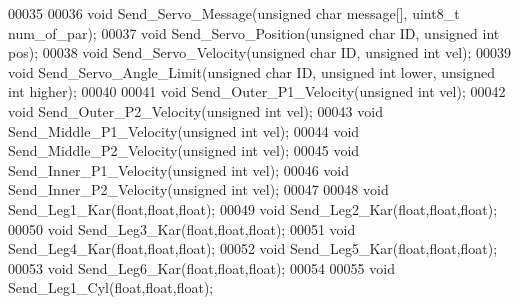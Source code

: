\begin{DoxyCode}
00035 
00036 \textcolor{keywordtype}{void} Send\_Servo\_Message(\textcolor{keywordtype}{unsigned} \textcolor{keywordtype}{char} message[], uint8\_t num\_of\_par);
00037 \textcolor{keywordtype}{void} Send\_Servo\_Position(\textcolor{keywordtype}{unsigned} \textcolor{keywordtype}{char} ID, \textcolor{keywordtype}{unsigned} \textcolor{keywordtype}{int} pos);
00038 \textcolor{keywordtype}{void} Send\_Servo\_Velocity(\textcolor{keywordtype}{unsigned} \textcolor{keywordtype}{char} ID, \textcolor{keywordtype}{unsigned} \textcolor{keywordtype}{int} vel);
00039 \textcolor{keywordtype}{void} Send\_Servo\_Angle\_Limit(\textcolor{keywordtype}{unsigned} \textcolor{keywordtype}{char} ID, \textcolor{keywordtype}{unsigned} \textcolor{keywordtype}{int} lower, \textcolor{keywordtype}{unsigned} \textcolor{keywordtype}{int} higher);
00040 
00041 \textcolor{keywordtype}{void} Send\_Outer\_P1\_Velocity(\textcolor{keywordtype}{unsigned} \textcolor{keywordtype}{int} vel); 
00042 \textcolor{keywordtype}{void} Send\_Outer\_P2\_Velocity(\textcolor{keywordtype}{unsigned} \textcolor{keywordtype}{int} vel); 
00043 \textcolor{keywordtype}{void} Send\_Middle\_P1\_Velocity(\textcolor{keywordtype}{unsigned} \textcolor{keywordtype}{int} vel); 
00044 \textcolor{keywordtype}{void} Send\_Middle\_P2\_Velocity(\textcolor{keywordtype}{unsigned} \textcolor{keywordtype}{int} vel); 
00045 \textcolor{keywordtype}{void} Send\_Inner\_P1\_Velocity(\textcolor{keywordtype}{unsigned} \textcolor{keywordtype}{int} vel); 
00046 \textcolor{keywordtype}{void} Send\_Inner\_P2\_Velocity(\textcolor{keywordtype}{unsigned} \textcolor{keywordtype}{int} vel); 
00047 
00048 \textcolor{keywordtype}{void} Send\_Leg1\_Kar(\textcolor{keywordtype}{float},\textcolor{keywordtype}{float},\textcolor{keywordtype}{float});
00049 \textcolor{keywordtype}{void} Send\_Leg2\_Kar(\textcolor{keywordtype}{float},\textcolor{keywordtype}{float},\textcolor{keywordtype}{float});
00050 \textcolor{keywordtype}{void} Send\_Leg3\_Kar(\textcolor{keywordtype}{float},\textcolor{keywordtype}{float},\textcolor{keywordtype}{float});
00051 \textcolor{keywordtype}{void} Send\_Leg4\_Kar(\textcolor{keywordtype}{float},\textcolor{keywordtype}{float},\textcolor{keywordtype}{float});
00052 \textcolor{keywordtype}{void} Send\_Leg5\_Kar(\textcolor{keywordtype}{float},\textcolor{keywordtype}{float},\textcolor{keywordtype}{float});
00053 \textcolor{keywordtype}{void} Send\_Leg6\_Kar(\textcolor{keywordtype}{float},\textcolor{keywordtype}{float},\textcolor{keywordtype}{float});
00054 
00055 \textcolor{keywordtype}{void} Send\_Leg1\_Cyl(\textcolor{keywordtype}{float},\textcolor{keywordtype}{float},\textcolor{keywordtype}{float});

\end{DoxyCode}
